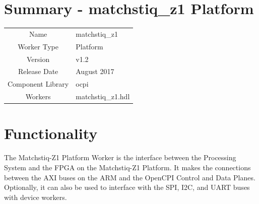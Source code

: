 \documentclass{article}
\author{} %
\date{Version \docVersion} %
\title{\docTitle}
\def\docVersion{1.2}
\def\comp{matchstiq\_z1}
\def\Comp{matchstiq\_z1 Platform}
\begin{document}
\section*{Summary - \Comp}
\begin{tabular}{|c|M{13.5cm}|}
	\hline
	                  &                                                    \\
	\hline
	Name              & \comp                                              \\
	\hline
	Worker Type       & Platform                                           \\
	\hline
	Version           & v\docVersion \\
	\hline
	Release Date      & August 2017 \\
	\hline
	Component Library & ocpi                                        \\
	\hline
	Workers & \comp.hdl                                        \\
	\hline
\end{tabular}

\section*{Functionality}
\begin{flushleft}
The Matchstiq-Z1 Platform Worker is the interface between the Processing System and the FPGA on the Matchstiq-Z1 Platform. It makes the connections between the AXI buses on the ARM and the OpenCPI Control and Data Planes. Optionally, it can also be used to interface with the SPI, I2C, and UART buses with device workers.
\end{flushleft}
\end{document}
